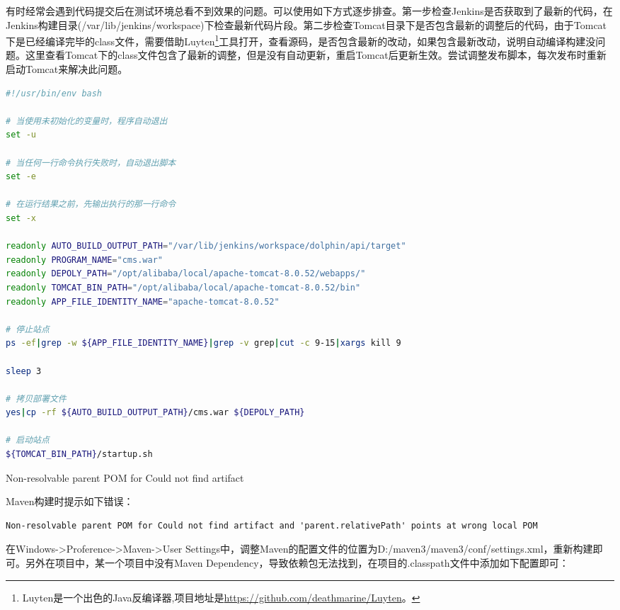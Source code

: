 \documentclass[8pt]{book}
\makeatletter
\numberwithin{dummy}{section}
\theoremstyle{ocrenumbox}
\theoremstyle{blacknumex}
\theoremstyle{blacknumbox}
\theoremstyle{ocrenum}
\renewcommand{\subsection}{\@startsection {subsection}{2}{\z@}
	{-3ex \@plus -0.1ex \@minus -.4ex}
	{0.5ex \@plus.2ex }
	{\normalfont\sffamily\bfseries}}
\makeatother
\begin{document}
有时经常会遇到代码提交后在测试环境总看不到效果的问题。可以使用如下方式逐步排查。第一步检查Jenkins是否获取到了最新的代码，在Jenkins构建目录(/var/lib/jenkins/workspace)下检查最新代码片段。第二步检查Tomcat目录下是否包含最新的调整后的代码，由于Tomcat下是已经编译完毕的class文件，需要借助Luyten\footnote{Luyten是一个出色的Java反编译器,项目地址是\url{https://github.com/deathmarine/Luyten}。}工具打开，查看源码，是否包含最新的改动，如果包含最新改动，说明自动编译构建没问题。这里查看Tomcat下的class文件包含了最新的调整，但是没有自动更新，重启Tomcat后更新生效。尝试调整发布脚本，每次发布时重新启动Tomcat来解决此问题。

\begin{lstlisting}[language=Bash]
#!/usr/bin/env bash

# 当使用未初始化的变量时，程序自动退出
set -u

# 当任何一行命令执行失败时，自动退出脚本
set -e

# 在运行结果之前，先输出执行的那一行命令
set -x

readonly AUTO_BUILD_OUTPUT_PATH="/var/lib/jenkins/workspace/dolphin/api/target"
readonly PROGRAM_NAME="cms.war"
readonly DEPOLY_PATH="/opt/alibaba/local/apache-tomcat-8.0.52/webapps/"
readonly TOMCAT_BIN_PATH="/opt/alibaba/local/apache-tomcat-8.0.52/bin"
readonly APP_FILE_IDENTITY_NAME="apache-tomcat-8.0.52"

# 停止站点
ps -ef|grep -w ${APP_FILE_IDENTITY_NAME}|grep -v grep|cut -c 9-15|xargs kill 9

sleep 3

# 拷贝部署文件
yes|cp -rf ${AUTO_BUILD_OUTPUT_PATH}/cms.war ${DEPOLY_PATH}

# 启动站点
${TOMCAT_BIN_PATH}/startup.sh
\end{lstlisting}

\subsection{Non-resolvable parent POM for Could not find artifact}

Maven构建时提示如下错误：

\begin{lstlisting}
Non-resolvable parent POM for Could not find artifact and 'parent.relativePath' points at wrong local POM
\end{lstlisting}

在Windows->Proference->Maven->User Settings中，调整Maven的配置文件的位置为D:/maven3/maven3/conf/settings.xml，重新构建即可。另外在项目中，某一个项目中没有Maven Dependency，导致依赖包无法找到，在项目的.classpath文件中添加如下配置即可：
\end{document}
